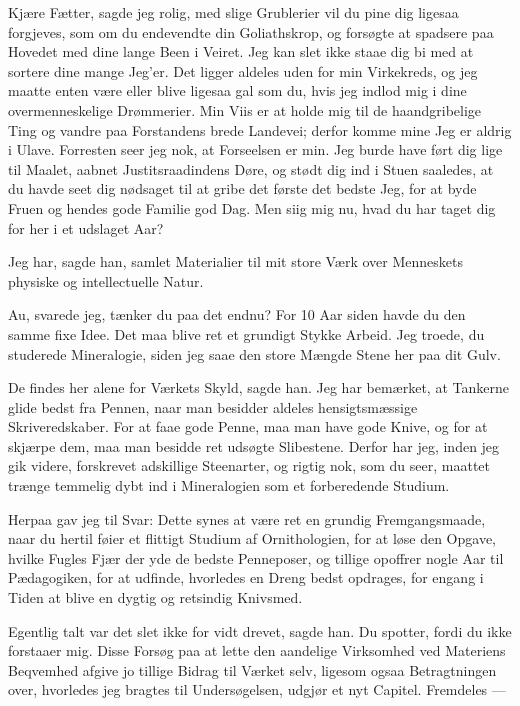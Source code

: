 \documentclass[12pt]{article}
\newcommand{\apage}[1]{\marginnote{\footnotesize\textit{[#1]}}}
\begin{document}
Kjære Fætter, sagde jeg rolig, med slige Grublerier vil du pine
dig ligesaa forgjeves, som om du endevendte din Goliathskrop, og
forsøgte at spadsere paa Hovedet med dine lange Been i Veiret. Jeg
kan slet ikke staae dig bi med at sortere dine mange Jeg'er. Det
ligger aldeles uden for min Virkekreds, og jeg maatte enten være eller
blive ligesaa gal som du, hvis jeg indlod mig i dine overmenneskelige
Drømmerier. Min Viis er at holde mig til de haandgribelige Ting og
vandre paa \apage{93} Forstandens brede Landevei; derfor komme mine Jeg er aldrig
i Ulave. Forresten seer jeg nok, at Forseelsen er min. Jeg burde have
ført dig lige til Maalet, aabnet Justitsraadindens Døre, og stødt dig
ind i Stuen saaledes, at du havde seet dig nødsaget til at gribe det
første det bedste Jeg, for at byde Fruen og hendes gode Familie god
Dag. Men siig mig nu, hvad du har taget dig for her i et udslaget Aar?

Jeg har, sagde han, samlet Materialier til mit store Værk over
Menneskets physiske og intellectuelle Natur.

Au, svarede jeg, tænker du paa det endnu? For 10 Aar siden havde
du den samme fixe Idee. Det maa blive ret et grundigt Stykke Arbeid.
Jeg troede, du studerede Mineralogie, siden jeg saae den store Mængde
Stene her paa dit Gulv.

De findes her alene for Værkets Skyld, sagde han. Jeg har bemærket,
at Tankerne glide bedst fra Pennen, naar man besidder aldeles
hensigtsmæssige Skriveredskaber. For at faae gode Penne, maa man have
gode Knive, og for at skjærpe dem, maa man besidde ret udsøgte
Slibestene. Derfor har jeg, inden jeg gik videre, forskrevet adskillige
Steenarter, og rigtig nok, som du seer, maattet trænge temmelig dybt
ind i Mineralogien som et forberedende Studium.

Herpaa gav jeg til Svar: Dette synes at være ret en grundig
Fremgangsmaade, naar du hertil føier et flittigt Studium af
Ornithologien, for at løse den Opgave, hvilke Fugles Fjær der yde de
bedste Penneposer, og tillige opoffrer nogle Aar til Pædagogiken, for
at udfinde, hvorledes en Dreng bedst opdrages, for engang i Tiden at
blive en dygtig og retsindig Knivsmed.

Egentlig talt var det slet ikke for vidt drevet, sagde han. Du
spotter, fordi du ikke forstaaer mig. Disse Forsøg paa at lette den
aandelige Virksomhed ved Materiens Beqvemhed afgive jo tillige Bidrag
til Værket selv, ligesom ogsaa Betragtningen \apage{94} over, hvorledes jeg
bragtes til Undersøgelsen, udgjør et nyt Capitel. Fremdeles ---
\end{document}
